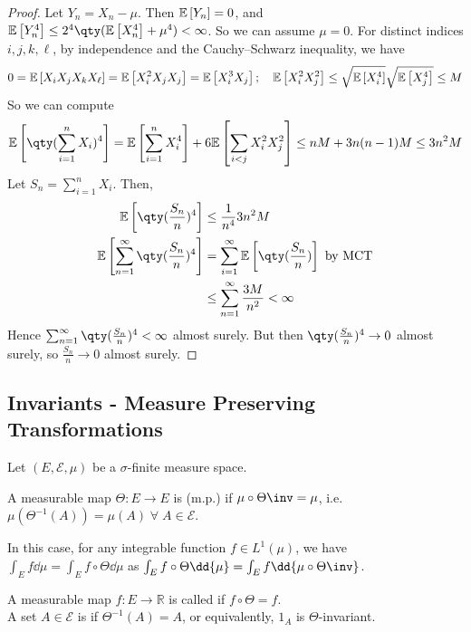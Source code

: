 \begin{proof}
	Let $Y_n = X_n - \mu$.
	Then $\mathbb{E}\left[{Y_n}\right] = 0$, and $\expect{Y_n^4} \leq 2^4 \qty(\expect{X_n^4} + \mu^4) < \infty$.
	So we can assume $\mu = 0$.
	For distinct indices $i, j, k, \ell$, by independence and the Cauchy--Schwarz inequality, we have
	\begin{align*}
        0 = \mathbb{E}\left[{X_i X_j X_k X_\ell}\right] = \mathbb{E}\left[{X_i^2 X_j X_j}\right] = \mathbb{E}\left[{X_i^3 X_j}\right];\quad \mathbb{E}\left[{X_i^2 X_j^2}\right] \leq \sqrt{\mathbb{E}\left[{X_i^4}\right]}\sqrt{\mathbb{E}\left[{X_j^4}\right]} \leq M
    \end{align*}
	So we can compute
	\begin{align*}
		\expect{\qty(\sum_{i=1}^n X_i)^4} = \expect{\sum_{i=1}^n X_i^4} + 6\expect{\sum_{i < j} X_i^2 X_j^2} \leq nM + 3n(n-1)M \leq 3n^2 M
    \end{align*}
	Let $S_n = \sum_{i=1}^n X_i$.
	Then,
	\begin{align*}
		\expect{\qty(\frac{S_n}{n})^4} &\leq \frac{1}{n^4} 3n^2 M \\
        \expect{\sum_{n=1}^\infty \qty(\frac{S_n}{n})^4} &= \sum_{i=1}^{\infty} \expect{\qty(\frac{S_n}{n})} \text{ by MCT} \\
		&\leq \sum_{n=1}^\infty \frac{3M}{n^2} < \infty
    \end{align*}
	Hence $\sum_{n=1}^\infty \qty(\frac{S_n}{n})^4 < \infty$ almost surely.
	But then $\qty(\frac{S_n}{n})^4 \to 0$ almost surely, so $\frac{S_n}{n} \to 0$ almost surely.
\end{proof}

\subsection{Invariants - Measure Preserving Transformations}

Let $(E, \mathcal E, \mu)$ be a $\sigma$-finite measure space.

\begin{definition}
	A measurable map $\Theta \colon E \to E$ is  (m.p.) if $\mu \circ \Theta\inv = \mu$, i.e. $\mu(\Theta^{-1}(A)) = \mu(A) \; \forall \; A \in \mathcal E$.
\end{definition}

In this case, for any integrable function $f \in L^1(\mu)$, we have $\int_E f \dd{\mu} = \int_E f \circ \Theta \dd{\mu}$ as $\int_E f \circ \Theta \dd{\mu} = \int_E f \dd{\mu \circ \Theta\inv}$.

\begin{definition}
	A measurable map $f \colon E \to \mathbb R$ is called  if $f \circ \Theta = f$. \\
	A set $A \in \mathcal E$ is  if $\Theta^{-1}(A) = A$, or equivalently, $1_A$ is $\Theta$-invariant.
\end{definition}

